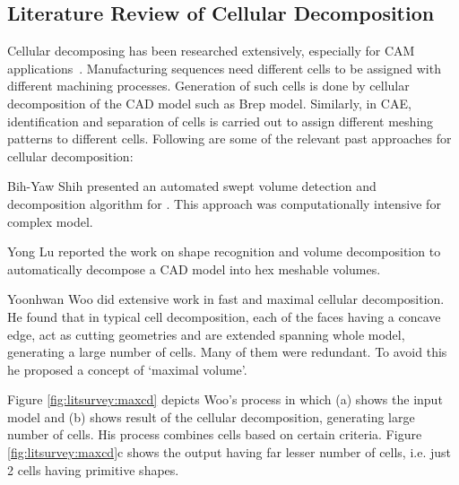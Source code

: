 

\subsection{Literature Review of Cellular Decomposition}

Cellular decomposing has been researched extensively, especially for CAM applications~\cite{Ma2009}. Manufacturing sequences need different cells to be assigned with different machining processes. Generation of such cells is done by cellular decomposition of the CAD model such as Brep model. Similarly, in CAE, identification and separation of cells is carried out to assign different meshing patterns to different cells. Following are some of the relevant past approaches for cellular decomposition:

Bih-Yaw Shih \cite{Shih1996} presented an automated swept volume detection and decomposition algorithm for . This approach was computationally intensive for complex model. 

Yong Lu \cite{LuGadhTautges2001} reported the work on shape recognition and volume decomposition to automatically decompose a CAD model into hex meshable volumes. 

Yoonhwan Woo \cite{Woo2002} \cite{Woo2003} \cite{Woo2003a} \cite{Woo2006} \cite{Woo2009}  did extensive work in fast and maximal cellular decomposition. He found that in typical cell decomposition, each of the faces having a concave edge, act as cutting geometries and are extended spanning whole model, generating a large number of cells. Many of them were redundant. To avoid this he proposed a concept of `maximal volume'. 

Figure \ref{fig:litsurvey:maxcd} depicts Woo's process in which (a) shows the input model and (b) shows result of the cellular decomposition, generating large number of cells. His process combines cells based on certain criteria. Figure \ref{fig:litsurvey:maxcd}c shows the output having far lesser number of cells, i.e. just 2 cells having primitive shapes. 
 
 
